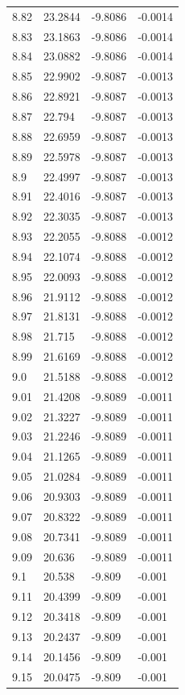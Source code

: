 \begin{tabular}{llll}
8.82 & 23.2844 & -9.8086 & -0.0014 \\
8.83 & 23.1863 & -9.8086 & -0.0014 \\
8.84 & 23.0882 & -9.8086 & -0.0014 \\
8.85 & 22.9902 & -9.8087 & -0.0013 \\
8.86 & 22.8921 & -9.8087 & -0.0013 \\
8.87 & 22.794 & -9.8087 & -0.0013 \\
8.88 & 22.6959 & -9.8087 & -0.0013 \\
8.89 & 22.5978 & -9.8087 & -0.0013 \\
8.9 & 22.4997 & -9.8087 & -0.0013 \\
8.91 & 22.4016 & -9.8087 & -0.0013 \\
8.92 & 22.3035 & -9.8087 & -0.0013 \\
8.93 & 22.2055 & -9.8088 & -0.0012 \\
8.94 & 22.1074 & -9.8088 & -0.0012 \\
8.95 & 22.0093 & -9.8088 & -0.0012 \\
8.96 & 21.9112 & -9.8088 & -0.0012 \\
8.97 & 21.8131 & -9.8088 & -0.0012 \\
8.98 & 21.715 & -9.8088 & -0.0012 \\
8.99 & 21.6169 & -9.8088 & -0.0012 \\
9.0 & 21.5188 & -9.8088 & -0.0012 \\
9.01 & 21.4208 & -9.8089 & -0.0011 \\
9.02 & 21.3227 & -9.8089 & -0.0011 \\
9.03 & 21.2246 & -9.8089 & -0.0011 \\
9.04 & 21.1265 & -9.8089 & -0.0011 \\
9.05 & 21.0284 & -9.8089 & -0.0011 \\
9.06 & 20.9303 & -9.8089 & -0.0011 \\
9.07 & 20.8322 & -9.8089 & -0.0011 \\
9.08 & 20.7341 & -9.8089 & -0.0011 \\
9.09 & 20.636 & -9.8089 & -0.0011 \\
9.1 & 20.538 & -9.809 & -0.001 \\
9.11 & 20.4399 & -9.809 & -0.001 \\
9.12 & 20.3418 & -9.809 & -0.001 \\
9.13 & 20.2437 & -9.809 & -0.001 \\
9.14 & 20.1456 & -9.809 & -0.001 \\
9.15 & 20.0475 & -9.809 & -0.001 \\

\end{tabular}
